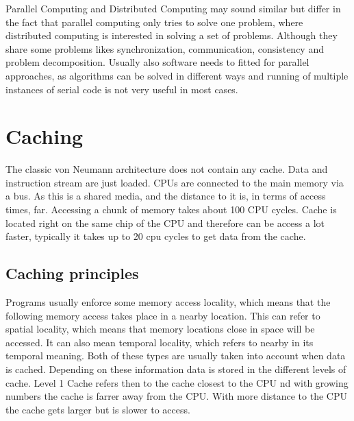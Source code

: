 \documentclass{article}
\begin{document}
	Parallel Computing and Distributed Computing may sound similar 
	but differ in the fact that parallel computing only tries to solve one problem,
	where distributed computing is interested in solving a set of problems.
	Although they share some problems likes synchronization,
	communication, consistency and problem decomposition.
	Usually also software needs to fitted for parallel approaches,
	as algorithms can be solved in different ways
	and running of multiple instances of serial code is not very useful in most cases.

\section{Caching} %
\label{sec:caching}
The classic von Neumann architecture does not contain any cache.
Data and instruction stream are just loaded.
CPUs are connected to the main memory via a bus.
As this is a shared media, and the distance to it is,
in terms of access times, far.
Accessing a chunk of memory takes about 100 CPU cycles.
Cache is located right on the same chip of the CPU and therefore can be access a lot faster,
typically it takes up to 20 cpu cycles to get data from the cache.

\subsection{Caching principles} %
\label{sub:caching_principles}
	Programs usually enforce some memory access locality,
	which means that the following memory access takes place in a nearby location. 
	This can refer to spatial locality,
	which means that memory locations close in space will be accessed.
	It can also mean temporal locality, which refers to nearby in its temporal meaning.
	Both of these types are usually taken into account when data is cached.
	Depending on these information data is stored in the different levels of cache.
	Level 1 Cache refers then to the cache closest to the CPU 
	nd with growing numbers the cache is farrer away from the CPU.
	With more distance to the CPU the cache gets larger but is slower to access.
\end{document}
